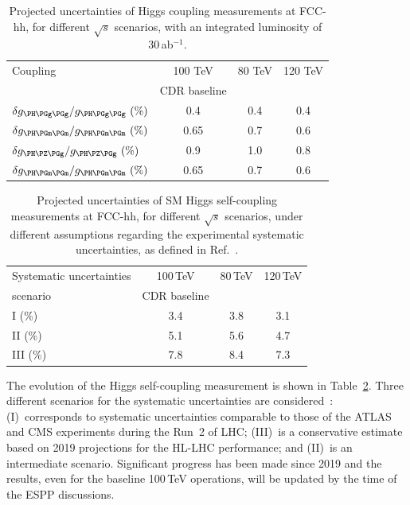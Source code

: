 \begin{table}[ht]
\centering
\caption{Projected uncertainties of Higgs coupling measurements at FCC-hh, 
for different $\sqrt{s}$ scenarios, with an integrated luminosity of 30\,ab$^{-1}$.}
\label{tab:FCChh_sce_H}
\begin{tabular}{ l   c c   c }%
\toprule
Coupling & 100 TeV & 80 TeV & 120 TeV   \\
 & CDR baseline & & \\
\midrule 
$\delta g_{\PH\PGg\PGg}/g_{\PH\PGg\PGg}~(\%)$
& 0.4 & 0.4 & 0.4 \\
$\delta g_{\PH\PGm\PGm}/g_{\PH\PGm\PGm}~(\%)$
& 0.65 & 0.7 & 0.6 \\
$\delta g_{\PH\PZ\PGg}/g_{\PH\PZ\PGg}~(\%)$
& 0.9 & 1.0 & 0.8 \\
$\delta g_{\PH\PGm\PGm}/g_{\PH\PGm\PGm}~(\%)$
& 0.65 & 0.7 & 0.6 \\
\bottomrule
\end{tabular}
\end{table}
\begin{table}[ht]
\centering
\caption{Projected uncertainties of SM Higgs self-coupling measurements at FCC-hh, 
for different $\sqrt{s}$ scenarios, under different assumptions regarding the experimental systematic uncertainties, 
as defined in Ref.~\cite{Mangano:2020sao}.}
\label{tab:FCChh_sce_HH}
\begin{tabular}{ l   c c   c }
\toprule
Systematic uncertainties & 100\,TeV & 80\,TeV & 120\,TeV   \\
 scenario & CDR baseline & & \\
\midrule 
I (\%) & 3.4 & 3.8 & 3.1 \\
II (\%)
& 5.1 & 5.6 & 4.7 \\
III (\%)
& 7.8 & 8.4 & 7.3 \\
\bottomrule
\end{tabular}
\end{table}

The evolution of the Higgs self-coupling measurement is shown in Table~\ref{tab:FCChh_sce_HH}. 
Three different scenarios for the systematic uncertainties are considered~\cite{Mangano:2020sao}: 
(I)~corresponds to systematic uncertainties comparable to those of the ATLAS and CMS experiments during the Run~2 of LHC;
(III)~is a conservative estimate based on 2019 projections for the HL-LHC performance; 
and (II)~is an intermediate scenario. 
Significant progress has been made since 2019 and the results, even for the baseline 100\,TeV operations, 
will be updated by the time of the ESPP discussions. 


